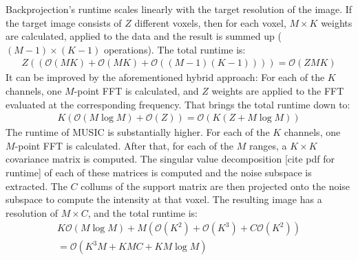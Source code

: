 Backprojection's runtime scales linearly with the target resolution of the image.
If the target image consists of $Z$ different voxels,
then for each voxel, $M\times K$ weights are calculated, applied to the data and the result is summed up ($(M-1) \times (K-1)$ operations).
The total runtime is:
\begin{align}
    Z \left(\left(\mathcal O(MK) + \mathcal O(MK) + \mathcal O((M-1)(K-1))\right)\right) = \mathcal O(ZMK)
\end{align}
It can be improved by the aforementioned hybrid approach:
For each of the $K$ channels, one $M$-point FFT is calculated,
and $Z$ weights are applied to the FFT evaluated at the corresponding frequency.
That brings the total runtime down to:
\begin{align}
    K \left( \mathcal O(M \log M) + \mathcal O(Z)\right) = \mathcal O \left(K(Z + M\log M) \right)
\end{align}
The runtime of MUSIC is substantially higher.
For each of the $K$ channels, one $M$-point FFT is calculated.
After that, for each of the $M$ ranges, a $K\times K$ covariance matrix is computed.
The singular value decomposition [cite pdf for runtime] of each of these matrices is computed and the noise subspace is extracted.
The $C$ collums of the support matrix are then projected onto the noise subspace to compute the intensity at that voxel.
The resulting image has a resolution of $M\times C$, and the total runtime is:
\begin{align}
    K \mathcal O ( M \log M) + M ( \mathcal O (K^2) + \mathcal O (K^3) + C \mathcal O(K^2)) \\
    = \mathcal O \left(K^3M +KMC+KM\log M\right)
\end{align}